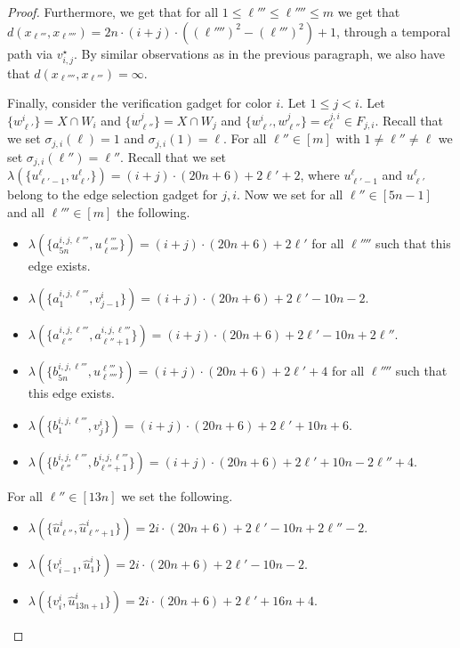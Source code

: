 \documentclass[a4paper,UKenglish,cleveref, autoref, thm-restate, anonymous]{lipics-v2021}
\begin{document}
\begin{proof}
 Furthermore, we get that for all $1\le \ell'''\le\ell''''\le m$ we get that $d(x_{\ell'''},x_{\ell''''})=2n\cdot (i+j)\cdot((\ell'''')^2-(\ell''')^2)+1$, through a temporal path via $v_{i,j}^\star$.
By similar observations as in the previous paragraph, we also have that $d(x_{\ell''''},x_{\ell'''})=\infty$.

Finally, consider the verification gadget for color $i$. 
Let $1\le j<i$. 
Let $\{w^i_{\ell'}\}=X\cap W_i$ and $\{w^j_{\ell''}\}=X\cap W_j$ and $\{w^i_{\ell'},w^j_{\ell''}\}=e^{j,i}_\ell\in F_{j,i}$. 
Recall that we set $\sigma_{j,i}(\ell)=1$ and $\sigma_{j,i}(1)=\ell$. For all $\ell''\in[m]$ with $1\neq\ell''\neq\ell$ we set $\sigma_{j,i}(\ell'')=\ell''$.
Recall that we set $\lambda(\{u^{\ell}_{\ell'-1},u^{\ell}_{\ell'}\})=(i+j)\cdot (20n+6)+2\ell'+2$, where $u^{\ell}_{\ell'-1}$ and $u^{\ell}_{\ell'}$ belong to the edge selection gadget for $j,i$.
Now we set for all $\ell''\in[5n-1]$ and all $\ell'''\in[m]$ the following.
\begin{itemize}
    \item $\lambda(\{a^{i,j,\ell'''}_{5n},u^{\ell'''}_{\ell''''}\})=(i+j)\cdot (20n+6)+2\ell'$ for all $\ell''''$ such that this edge exists.
    \item $\lambda(\{a^{i,j,\ell'''}_{1},v^i_{j-1}\})=(i+j)\cdot (20n+6)+2\ell'-10n-2$.
    \item $\lambda(\{a^{i,j,\ell'''}_{\ell''},a^{i,j,\ell'''}_{\ell''+1}\})=(i+j)\cdot (20n+6)+2\ell'-10n+2\ell''$.
    \item $\lambda(\{b^{i,j,\ell'''}_{5n},u^{\ell'''}_{\ell''''}\})=(i+j)\cdot (20n+6)+2\ell'+4$ for all $\ell''''$ such that this edge exists.
    \item $\lambda(\{b^{i,j,\ell'''}_{1},v^i_{j}\})=(i+j)\cdot (20n+6)+2\ell'+10n+6$.
    \item $\lambda(\{b^{i,j,\ell'''}_{\ell''},b^{i,j,\ell'''}_{\ell''+1}\})=(i+j)\cdot (20n+6)+2\ell'+10n-2\ell''+4$.
\end{itemize}
For all $\ell''\in[13n]$ we set the following.
\begin{itemize}
    \item $\lambda(\{\hat{u}^i_{\ell''},\hat{u}^i_{\ell''+1}\})=2i\cdot (20n+6)+2\ell'-10n+2\ell''-2$.
    \item $\lambda(\{v^i_{i-1},\hat{u}^i_{1}\})=2i\cdot (20n+6)+2\ell'-10n-2$.
    \item $\lambda(\{v^i_i,\hat{u}^i_{13n+1}\})=2i\cdot (20n+6)+2\ell'+16n+4$.
\end{itemize}

\end{proof}
\end{document}

